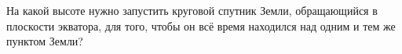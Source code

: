 На какой высоте нужно запустить круговой спутник Земли, обращающийся в плоскости экватора, 
для того, чтобы он всё время находился над одним и тем же пунктом Земли?
